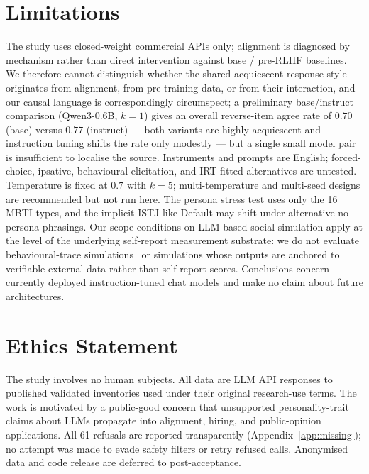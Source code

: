 \documentclass[11pt]{article}
\begin{document}
\section*{Limitations}
\label{sec:limitations}

The study uses closed-weight commercial APIs only; alignment is diagnosed by mechanism rather than direct intervention against base / pre-RLHF baselines. We therefore cannot distinguish whether the shared acquiescent response style originates from alignment, from pre-training data, or from their interaction, and our causal language is correspondingly circumspect; a preliminary base/instruct comparison (Qwen3-0.6B, $k{=}1$) gives an overall reverse-item agree rate of $0.70$ (base) versus $0.77$ (instruct) --- both variants are highly acquiescent and instruction tuning shifts the rate only modestly --- but a single small model pair is insufficient to localise the source. Instruments and prompts are English; forced-choice, ipsative, behavioural-elicitation, and IRT-fitted alternatives are untested. Temperature is fixed at $0.7$ with $k{=}5$; multi-temperature and multi-seed designs are recommended but not run here. The persona stress test uses only the 16 MBTI types, and the implicit ISTJ-like Default may shift under alternative no-persona phrasings. Our scope conditions on LLM-based social simulation apply at the level of the underlying self-report measurement substrate: we do not evaluate behavioural-trace simulations~\citep{park2023generative} or simulations whose outputs are anchored to verifiable external data rather than self-report scores. Conclusions concern currently deployed instruction-tuned chat models and make no claim about future architectures.


\section*{Ethics Statement}
\label{sec:ethics}

The study involves no human subjects. All data are LLM API responses to published validated inventories used under their original research-use terms. The work is motivated by a public-good concern that unsupported personality-trait claims about LLMs propagate into alignment, hiring, and public-opinion applications. All 61 refusals are reported transparently (Appendix~\ref{app:missing}); no attempt was made to evade safety filters or retry refused calls. Anonymised data and code release are deferred to post-acceptance.
\end{document}
